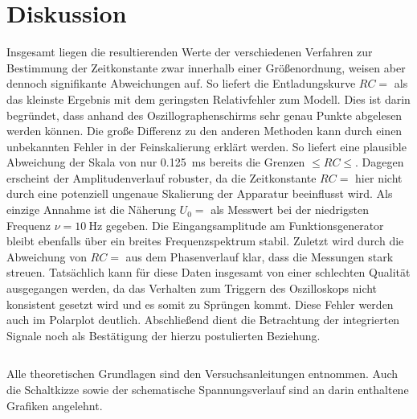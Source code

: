 
\vfill

\section{Diskussion}
\label{sec:diskussion}

Insgesamt liegen die resultierenden Werte der verschiedenen Verfahren zur Bestimmung der Zeitkonstante
zwar innerhalb einer Größenordnung, weisen aber dennoch signifikante Abweichungen auf. So liefert die
Entladungskurve $RC = $ als das kleinste Ergebnis mit dem geringsten Relativfehler
zum Modell. Dies ist darin begründet, dass anhand des Oszillographenschirms sehr genau Punkte
abgelesen werden können. Die große Differenz zu den anderen Methoden kann durch einen unbekannten Fehler
in der Feinskalierung erklärt werden. So liefert eine plausible Abweichung der Skala von nur
\qty{0.125}{\milli\second} bereits die Grenzen
$ \leq RC \leq $.
Dagegen erscheint der Amplitudenverlauf robuster, da die Zeitkonstante
$RC = $ hier nicht durch eine potenziell ungenaue Skalierung der Apparatur
beeinflusst wird. Als einzige Annahme ist die Näherung $U_0 = $ als Messwert bei der
niedrigsten Frequenz $\nu = \qty{10}{\hertz}$ gegeben. Die Eingangsamplitude am Funktionsgenerator bleibt
ebenfalls über ein breites Frequenzspektrum stabil. Zuletzt wird durch die
Abweichung von $RC = $ aus dem Phasenverlauf klar, dass die Messungen
stark streuen. Tatsächlich kann für diese Daten insgesamt von einer schlechten Qualität ausgegangen werden, da
das Verhalten zum Triggern des Oszilloskops nicht konsistent gesetzt wird und es somit zu Sprüngen kommt.
Diese Fehler werden auch im Polarplot deutlich. Abschließend dient die Betrachtung der integrierten Signale
noch als Bestätigung der hierzu postulierten Beziehung.

\newpage

$ $

\vfill

Alle theoretischen Grundlagen sind den Versuchsanleitungen \cite{brücke, relax} entnommen. Auch die Schaltkizze
sowie der schematische Spannungsverlauf sind an darin enthaltene Grafiken angelehnt.
